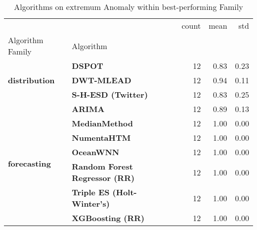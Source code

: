 \begin{table}
\caption{Algorithms on extremum Anomaly within best-performing Family}
\label{tab:bp-extremum}
\begin{tabular}{llrrr}
\toprule
 &  & count & mean & std \\
Algorithm Family & Algorithm &  &  &  \\
\midrule
\multirow[t]{3}{*}{\textbf{distribution}} & \textbf{DSPOT} & 12 & 0.83 & 0.23 \\
\textbf{} & \textbf{DWT-MLEAD} & 12 & 0.94 & 0.11 \\
\textbf{} & \textbf{S-H-ESD (Twitter)} & 12 & 0.83 & 0.25 \\
\cline{1-5}
\multirow[t]{7}{*}{\textbf{forecasting}} & \textbf{ARIMA} & 12 & 0.89 & 0.13 \\
\textbf{} & \textbf{MedianMethod} & 12 & 1.00 & 0.00 \\
\textbf{} & \textbf{NumentaHTM} & 12 & 1.00 & 0.00 \\
\textbf{} & \textbf{OceanWNN} & 12 & 1.00 & 0.00 \\
\textbf{} & \textbf{Random Forest Regressor (RR)} & 12 & 1.00 & 0.00 \\
\textbf{} & \textbf{Triple ES (Holt-Winter's)} & 12 & 1.00 & 0.00 \\
\textbf{} & \textbf{XGBoosting (RR)} & 12 & 1.00 & 0.00 \\
\cline{1-5}
\bottomrule
\end{tabular}
\end{table}
